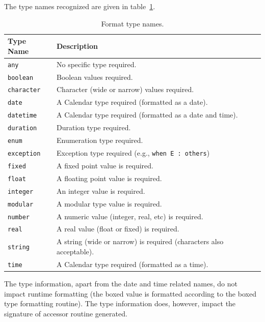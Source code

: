 The type names recognized are given in table~\ref{tab:formattypes}.
\begin{table}
\begin{tabular}{lp{4in}}\hline
Type Name          & Description\\\hline
\texttt{any}       & No specific type required.\\
\texttt{boolean}   & Boolean values required.\\
\texttt{character} & Character (wide or narrow) values required.\\
\texttt{date}      & A Calendar type required (formatted as a date).\\
\texttt{datetime}  & A Calendar type required (formatted as a date and time).\\
\texttt{duration}  & Duration type required.\\
\texttt{enum}      & Enumeration type required.\\
\texttt{exception} & Exception type required (e.g., \texttt{when E : others})\\
\texttt{fixed}     & A fixed point value is required.\\
\texttt{float}     & A floating point value is required.\\
\texttt{integer}   & An integer value is required.\\
\texttt{modular}   & A modular type value is required.\\
\texttt{number}    & A numeric value (integer, real, etc) is required.\\
\texttt{real}      & A real value (float or fixed) is required.\\
\texttt{string}    & A string (wide or narrow) is required (characters also
                     acceptable).\\
\texttt{time}      & A Calendar type required (formatted as a time).\\\hline
\end{tabular}
\caption{Format type names.}
\label{tab:formattypes}
\end{table}

The type information, apart from the date and time related names, do not
impact runtime formatting (the boxed value is formatted according to the
boxed type formatting routine).  The type information does, however, impact
the signature of accessor routine generated.

